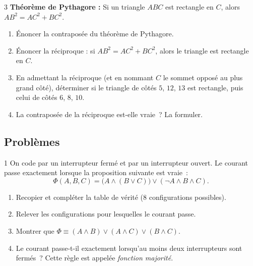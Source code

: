 \begin{exo}{3}
\textbf{Th\'eor\`eme de Pythagore :} Si un triangle $ABC$ est rectangle en $C$,
alors $AB^2 = AC^2 + BC^2$.

\begin{enumerate}
  \item \'Enoncer la contrapos\'ee du th\'eor\`eme de Pythagore.
  \item \'Enoncer la r\'eciproque : si $AB^2 = AC^2 + BC^2$, alors le
        triangle est rectangle en $C$.
  \item En admettant la r\'eciproque (et en nommant $C$ le sommet oppos\'e au
        plus grand c\^ot\'e), d\'eterminer si le triangle de c\^ot\'es
        $5$, $12$, $13$ est rectangle, puis celui de c\^ot\'es $6$, $8$, $10$.
  \item La contrapos\'ee de la r\'eciproque est-elle vraie~? La formuler.
\end{enumerate}
\end{exo}

\subsection*{Probl\`emes}

\begin{probleme}{1}
On code par \vrai{} un interrupteur ferm\'e et par \faux{} un interrupteur ouvert.
Le courant passe exactement lorsque la proposition suivante est vraie~:
$$\Phi(A,B,C) = \bigl(A \land (B \lor C)\bigr) \lor (\lnot A \land B \land C).$$
\begin{enumerate}
  \item Recopier et compl\'eter la table de v\'erit\'e ($8$ configurations possibles).
  \item Relever les configurations pour lesquelles le courant passe.
  \item Montrer que $\Phi \equiv (A\land B)\lor(A\land C)\lor(B\land C)$.
  \item Le courant passe-t-il exactement lorsqu'au moins deux interrupteurs sont ferm\'es~?
        Cette r\`egle est appel\'ee \emph{fonction majorit\'e}.
\end{enumerate}
\end{probleme}

